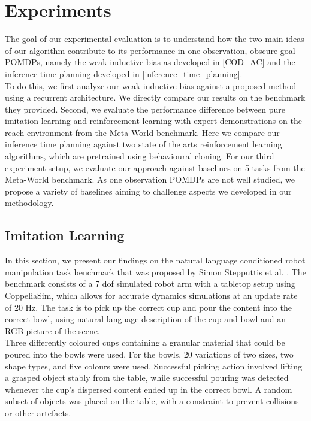 
\chapter{Experiments}
\label{chapter:Experiments}
The goal of our experimental evaluation is to understand how the two main ideas of our algorithm contribute to its 
performance in one observation, obscure goal POMDPs, namely the weak inductive bias as developed in \ref{COD_AC} and 
the inference time planning developed in \ref{inference_time_planning}. \\
To do this, we first analyze our weak inductive bias against a proposed method using a recurrent architecture.
We directly compare our results on the benchmark they provided. Second, we evaluate the performance difference between 
pure imitation learning and reinforcement learning with expert demonstrations on the reach environment from the Meta-World benchmark. 
Here we compare our inference time planning against two state of the arts reinforcement learning algorithms, which are pretrained using 
behavioural cloning. For our third experiment setup, we evaluate our approach against baselines on 5 tasks from the Meta-World benchmark. 
As one observation POMDPs are not well studied, we propose a variety of baselines aiming to challenge aspects we developed in our methodology.


\section{Imitation Learning}
In this section, we present our findings on the natural language conditioned robot manipulation task benchmark that was proposed by 
Simon Stepputtis et al. \cite{stepputtis2020languageconditioned}. The benchmark consists of a 7 dof simulated robot arm with a 
tabletop setup using CoppeliaSim, which allows for accurate dynamics simulations at an update rate of 20 Hz. The task is to pick 
up the correct cup and pour the content into the correct bowl, using natural language description of the cup and bowl and an RGB 
picture of the scene.\\

Three differently coloured cups containing a granular material that could be poured into the bowls were used. For the bowls, 
20 variations of two sizes, two shape types, and five colours were used. Successful picking action involved lifting a grasped 
object stably from the table, while successful pouring was detected whenever the cup's dispersed content ended up in the correct bowl. 
A random subset of objects was placed on the table, with a constraint to prevent collisions or other artefacts.\\

